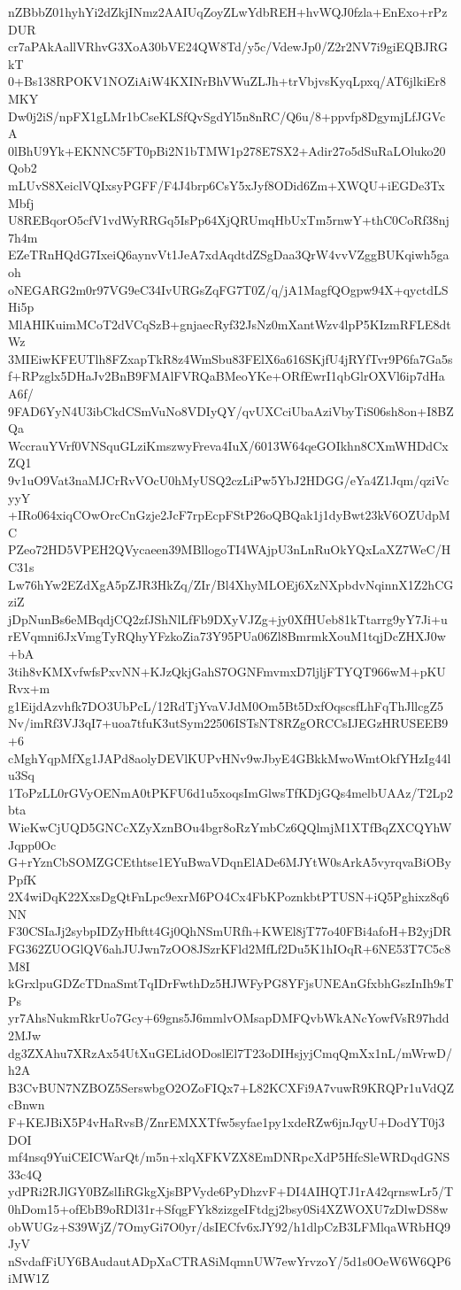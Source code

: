 nZBbbZ01hyhYi2dZkjINmz2AAIUqZoyZLwYdbREH+hvWQJ0fzla+EnExo+rPzDUR
cr7aPAkAallVRhvG3XoA30bVE24QW8Td/y5c/VdewJp0/Z2r2NV7i9giEQBJRGkT
0+Bs138RPOKV1NOZiAiW4KXINrBhVWuZLJh+trVbjvsKyqLpxq/AT6jlkiEr8MKY
Dw0j2iS/npFX1gLMr1bCseKLSfQvSgdYl5n8nRC/Q6u/8+ppvfp8DgymjLfJGVcA
0lBhU9Yk+EKNNC5FT0pBi2N1bTMW1p278E7SX2+Adir27o5dSuRaLOluko20Qob2
mLUvS8XeiclVQIxsyPGFF/F4J4brp6CsY5xJyf8ODid6Zm+XWQU+iEGDe3TxMbfj
U8REBqorO5cfV1vdWyRRGq5IsPp64XjQRUmqHbUxTm5rnwY+thC0CoRf38nj7h4m
EZeTRnHQdG7IxeiQ6aynvVt1JeA7xdAqdtdZSgDaa3QrW4vvVZggBUKqiwh5gaoh
oNEGARG2m0r97VG9eC34IvURGsZqFG7T0Z/q/jA1MagfQOgpw94X+qyctdLSHi5p
MlAHIKuimMCoT2dVCqSzB+gnjaecRyf32JsNz0mXantWzv4lpP5KIzmRFLE8dtWz
3MIEiwKFEUTlh8FZxapTkR8z4WmSbu83FElX6a616SKjfU4jRYfTvr9P6fa7Ga5s
f+RPzglx5DHaJv2BnB9FMAlFVRQaBMeoYKe+ORfEwrI1qbGlrOXVl6ip7dHaA6f/
9FAD6YyN4U3ibCkdCSmVuNo8VDIyQY/qvUXCciUbaAziVbyTiS06sh8on+I8BZQa
WccrauYVrf0VNSquGLziKmszwyFreva4IuX/6013W64qeGOIkhn8CXmWHDdCxZQ1
9v1uO9Vat3naMJCrRvVOcU0hMyUSQ2czLiPw5YbJ2HDGG/eYa4Z1Jqm/qziVcyyY
+IRo064xiqCOwOrcCnGzje2JcF7rpEcpFStP26oQBQak1j1dyBwt23kV6OZUdpMC
PZeo72HD5VPEH2QVycaeen39MBllogoTI4WAjpU3nLnRuOkYQxLaXZ7WeC/HC31s
Lw76hYw2EZdXgA5pZJR3HkZq/ZIr/Bl4XhyMLOEj6XzNXpbdvNqinnX1Z2hCGziZ
jDpNunBs6eMBqdjCQ2zfJShNlLfFb9DXyVJZg+jy0XfHUeb81kTtarrg9yY7Ji+u
rEVqmni6JxVmgTyRQhyYFzkoZia73Y95PUa06Zl8BmrmkXouM1tqjDcZHXJ0w+bA
3tih8vKMXvfwfsPxvNN+KJzQkjGahS7OGNFmvmxD7ljljFTYQT966wM+pKURvx+m
g1EijdAzvhfk7DO3UbPcL/12RdTjYvaVJdM0Om5Bt5DxfOqscsfLhFqThJllcgZ5
Nv/imRf3VJ3qI7+uoa7tfuK3utSym22506ISTsNT8RZgORCCsIJEGzHRUSEEB9+6
cMghYqpMfXg1JAPd8aolyDEVlKUPvHNv9wJbyE4GBkkMwoWmtOkfYHzIg44lu3Sq
1ToPzLL0rGVyOENmA0tPKFU6d1u5xoqsImGlwsTfKDjGQs4melbUAAz/T2Lp2bta
WieKwCjUQD5GNCcXZyXznBOu4bgr8oRzYmbCz6QQlmjM1XTfBqZXCQYhWJqpp0Oc
G+rYznCbSOMZGCEthtse1EYuBwaVDqnElADe6MJYtW0sArkA5vyrqvaBiOByPpfK
2X4wiDqK22XxsDgQtFnLpc9exrM6PO4Cx4FbKPoznkbtPTUSN+iQ5Pghixz8q6NN
F30CSIaJj2sybpIDZyHbftt4Gj0QhNSmURfh+KWEl8jT77o40FBi4afoH+B2yjDR
FG362ZUOGlQV6ahJUJwn7zOO8JSzrKFld2MfLf2Du5K1hIOqR+6NE53T7C5c8M8I
kGrxlpuGDZcTDnaSmtTqIDrFwthDz5HJWFyPG8YFjsUNEAnGfxbhGszInIh9sTPs
yr7AhsNukmRkrUo7Gcy+69gns5J6mmlvOMsapDMFQvbWkANcYowfVsR97hdd2MJw
dg3ZXAhu7XRzAx54UtXuGELidODoslEl7T23oDIHsjyjCmqQmXx1nL/mWrwD/h2A
B3CvBUN7NZBOZ5SerswbgO2OZoFIQx7+L82KCXFi9A7vuwR9KRQPr1uVdQZcBnwn
F+KEJBiX5P4vHaRvsB/ZnrEMXXTfw5syfae1py1xdeRZw6jnJqyU+DodYT0j3DOI
mf4nsq9YuiCEICWarQt/m5n+xlqXFKVZX8EmDNRpcXdP5HfcSleWRDqdGNS33c4Q
ydPRi2RJlGY0BZslIiRGkgXjsBPVyde6PyDhzvF+DI4AIHQTJ1rA42qrnswLr5/T
0hDom15+ofEbB9oRDl31r+SfqgFYk8zizgeIFtdgj2bsy0Si4XZWOXU7zDlwDS8w
obWUGz+S39WjZ/7OmyGi7O0yr/dsIECfv6xJY92/h1dlpCzB3LFMlqaWRbHQ9JyV
nSvdafFiUY6BAudautADpXaCTRASiMqmnUW7ewYrvzoY/5d1s0OeW6W6QP6iMW1Z
